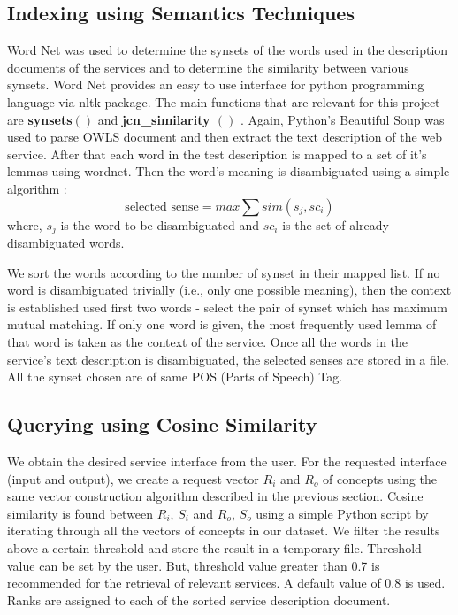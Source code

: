 \documentclass[12pt, oneside]{book}
\begin{document}
\subsection{Indexing using Semantics Techniques}
Word Net \cite{wordnet} was used to determine the synsets of the words used in the description documents of the services and to determine the similarity between various synsets. Word Net provides an easy to use interface for python programming language via nltk package. The main functions that are relevant for this project are \textbf{synsets$\left( \right)$} and \textbf{jcn\_similarity $\left( \right)$ }. Again, Python's Beautiful Soup was used to parse OWLS document and then extract the text description of the web service. After that each word in the test description is mapped to a set of it's lemmas using wordnet. Then the word's meaning is disambiguated using a simple algorithm :
\begin{equation}
 \text{selected sense} = max \sum sim(s_{j}, sc_{i})
\end{equation}
where, $s_{j}$ is the word to be disambiguated and $sc_{i}$ is the set of already disambiguated words. \\ \par
We sort the words according to the number of synset in their mapped list. If no word is disambiguated trivially (i.e., only one possible meaning), then the context is established used first two words - select the pair of synset which has maximum mutual matching. If only one word is given, the most frequently used lemma of that word is taken as the context of the service. Once all the words in the service's text description is disambiguated, the selected senses are stored in a file. All the synset chosen are of same POS (Parts of Speech) Tag.

\subsection{Querying using Cosine Similarity}
We obtain the desired service interface from the user. For the requested interface (input and output), we create a request vector $R_i$ and $R_{o}$ of concepts using the same vector construction algorithm described in the previous section. Cosine similarity is found between $R_{i}$, $S_{i}$ and $R_{o}$, $S_{o}$ using a simple Python script by iterating through all the vectors of concepts in our dataset. We filter the results above a certain threshold and store the result in a temporary file.  Threshold value can be set by the user. But, threshold value greater than 0.7 is recommended for the retrieval of relevant services. A default value of 0.8 is used. Ranks are assigned to each of the sorted service description document.
\end{document}
